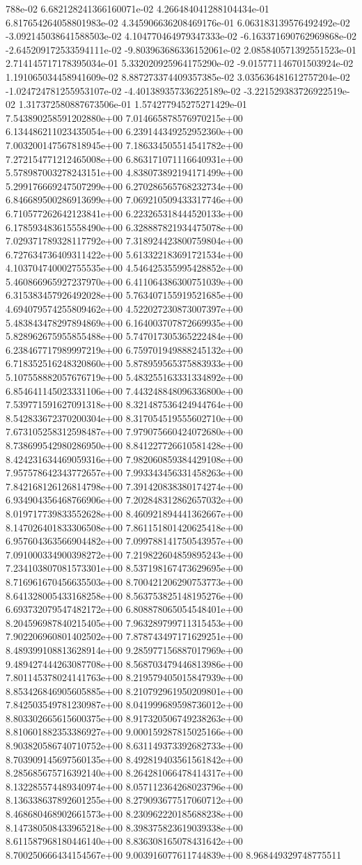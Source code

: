 788e-02	6.682128241366160071e-02	4.266484041288104434e-01	6.817654264058801983e-02	4.345906636208469176e-01	6.063183139576492492e-02	-3.092145038641588503e-02	4.104770464979347333e-02	-6.163371690762969868e-02	-2.645209172533594111e-02	-9.803963686336152061e-02	2.085840571392551523e-01	2.714145717178395034e-01	5.332020925964175290e-02	-9.015771146701503924e-02	1.191065034458941609e-02	8.887273374409357385e-02	3.035636481612757204e-02	-1.024724781255953107e-02	-4.401389357336225189e-02	-3.221529383726922519e-02	1.317372580887673506e-01	1.574277945275271429e-01
7.543890258591202880e+00	7.014665878576970215e+00	6.134486211023435054e+00	6.239144349252952360e+00	7.003200147567818945e+00	7.186334505514541782e+00	7.272154771212465008e+00	6.863171071116640931e+00	5.578987003278243151e+00	4.838073892194171499e+00	5.299176669247507299e+00	6.270286565768232734e+00	6.846689500286913699e+00	7.069210509433317746e+00	6.710577262642123841e+00	6.223265318444520133e+00	6.178593483615558490e+00	6.328887821934475078e+00	7.029371789328117792e+00	7.318924423800759804e+00	6.727634736409311422e+00	5.613322183691721534e+00	4.103704740002755535e+00	4.546425355995428852e+00	5.460866965927237970e+00	6.411064386300751039e+00	6.315383457926492028e+00	5.763407155919521685e+00	4.694079574255809462e+00	4.522027230873007397e+00	5.483843478297894869e+00	6.164003707872669935e+00	5.828962675955855488e+00	5.747017305365222484e+00	6.238467717989997219e+00	6.759701949888245132e+00	6.718352516248320860e+00	5.878959565375883933e+00	5.107558882057676719e+00	5.483255163331334892e+00	6.854641145023331106e+00	7.443248848096336800e+00	7.539771591627091318e+00	8.321487536424944764e+00	8.542833672370200304e+00	8.317054519555602710e+00	7.673105258312598487e+00	7.979075660424072680e+00	8.738699542980286950e+00	8.841227726610581428e+00	8.424231634469059316e+00	7.982060859384429108e+00	7.957578642343772657e+00	7.993343456331458263e+00	7.842168126126814798e+00	7.391420838380174274e+00	6.934904356468766906e+00	7.202848312862657032e+00	8.019717739833552628e+00	8.460921894441362667e+00	8.147026401833306508e+00	7.861151801420625418e+00	6.957604363566904482e+00	7.099788141750543957e+00	7.091000334900398272e+00	7.219822604859895243e+00	7.234103807081573301e+00	8.537198167473629695e+00	8.716961670456635503e+00	8.700421206290753773e+00	8.641328005433168258e+00	8.563753825148195276e+00	6.693732079547482172e+00	6.808878065054548401e+00	8.204596987840215405e+00	7.963289799711315453e+00	7.902206960801402502e+00	7.878743497171629251e+00	8.489399108813628914e+00	9.285977156887017969e+00	9.489427444263087708e+00	8.568703479446813986e+00	7.801145378024141763e+00	8.219579405015847939e+00	8.853426846905605885e+00	8.210792961950209801e+00	7.842503549781230987e+00	8.041999689598736012e+00	8.803302665615600375e+00	8.917320506749238263e+00	8.810601882353386927e+00	9.000159287815025166e+00	8.903820586740710752e+00	8.631149373392682733e+00	8.703909145697560135e+00	8.492819403561561842e+00	8.285685675716392140e+00	8.264281066478414317e+00	8.132285574489340974e+00	8.057112364268023796e+00	8.136338637892601255e+00	8.279093677517060712e+00	8.468680468902661573e+00	8.230962220185688238e+00	8.147380508433965218e+00	8.398375823619039338e+00	8.611587968180446140e+00	8.836308165078431642e+00	8.700250666434154567e+00	9.003916077611744839e+00	8.968449329748775511